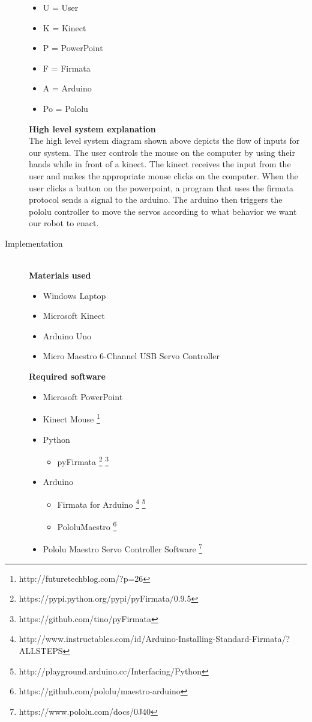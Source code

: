 \documentclass[12pt]{article}
\begin{document}
\begin{description}
\begin{tikzpicture}[thick]
		\end{tikzpicture}
		\begin{itemize}
			\item U = User
			\item K = Kinect
			\item P = PowerPoint
			\item F = Firmata
			\item A = Arduino
			\item Po = Pololu
		\end{itemize}
		\textbf{High level system explanation} \\
		The high level system diagram shown above depicts the flow of inputs for our system. The user controls the mouse on the computer by using their hands while in front of a kinect. The kinect receives the input from the user and makes the appropriate mouse clicks on the computer. When the user clicks a button on the powerpoint, a program that uses the firmata protocol sends a signal to the arduino. The arduino then triggers the pololu controller to move the servos according to what behavior we want our robot to enact. 
		\newpage
	\item[Implementation] \hfill \\
		
		\textbf{Materials used}
		\begin{itemize}
			\item Windows Laptop
			\item Microsoft Kinect
			\item Arduino Uno
			\item Micro Maestro 6-Channel USB Servo Controller
		\end{itemize}
		
		\textbf{Required software}
		\begin{itemize}
			\item Microsoft PowerPoint
			\item Kinect Mouse \footnote{http://futuretechblog.com/?p=26}
			\item Python
			\begin{itemize}
				\item pyFirmata \footnote{https://pypi.python.org/pypi/pyFirmata/0.9.5} \footnote{https://github.com/tino/pyFirmata}
			\end{itemize}
			\item Arduino
			\begin{itemize}
				\item Firmata for Arduino \footnote{http://www.instructables.com/id/Arduino-Installing-Standard-Firmata/?ALLSTEPS} \footnote{http://playground.arduino.cc/Interfacing/Python}
				\item PololuMaestro \footnote{https://github.com/pololu/maestro-arduino}
			\end{itemize}
			\item Pololu Maestro Servo Controller Software \footnote{https://www.pololu.com/docs/0J40}
		\end{itemize}
		

\end{description}
\end{document}
